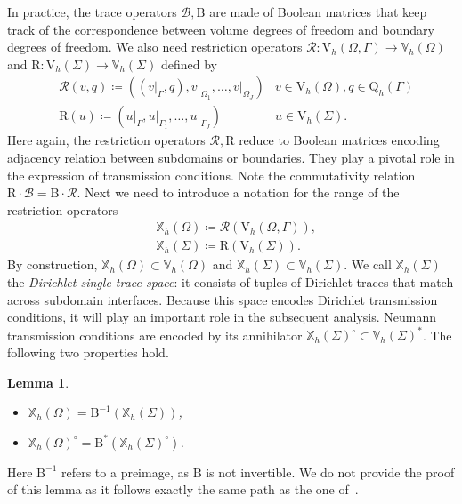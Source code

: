\documentclass[a4paper,11pt]{article}
\newcommand{\mB}{\mathrm{B}}
\newcommand{\mR}{\mathrm{R}}
\newcommand{\mbV}{\mathbb{V}}
\newcommand{\mbX}{\mathbb{X}}
\newcommand{\Vh}{\mathrm{V}_{h}}
\newcommand{\Qh}{\mathrm{Q}_{h}}
\newtheorem{lem}[defn]{Lemma}
\begin{document}
In practice, the trace operators $\mathcal{B},\mB$ are made of Boolean matrices that
keep track of the correspondence between volume degrees of freedom and
boundary degrees of freedom. We also need restriction operators
$\mathcal{R}\colon \Vh(\Omega,\Gamma)\to \mbV_h(\Omega)$ and 
$\mR\colon \Vh(\Sigma)\to \mbV_h(\Sigma)$ defined by 
\begin{equation}\label{DomainRestrictionOperators}
  \begin{aligned}
    & \mathcal{R}(v,q) \coloneq ((v\vert_{\Gamma},q),v\vert_{\Omega_1},\dots, v\vert_{\Omega_J})
    & v\in\Vh(\Omega), q\in \Qh(\Gamma) \\
    & \mR(u)  \coloneq (u\vert_{\Gamma},u\vert_{\Gamma_1},\dots, u\vert_{\Gamma_J})
    & u\in \Vh(\Sigma).
  \end{aligned}
\end{equation}
Here again, the restriction operators $\mathcal{R},\mR$ reduce to
Boolean matrices encoding adjacency relation between subdomains or
boundaries. They play a pivotal role in the expression of
transmission conditions. Note the commutativity relation
$\mR\cdot\mathcal{B} = \mB\cdot\mathcal{R}$. Next we need to introduce
a notation for the range of the restriction operators
\begin{equation}\label{DefinitionSingleTraceSpace}
  \begin{aligned}
    & \mbX_h(\Omega)\coloneq \mathcal{R}(\Vh(\Omega,\Gamma)),\\
    & \mbX_h(\Sigma)\coloneq \mR(\Vh(\Sigma)).
  \end{aligned}
\end{equation}
By construction, $\mbX_h(\Omega)\subset\mbV_h(\Omega)$ and
$\mbX_h(\Sigma)\subset\mbV_h(\Sigma)$. We call $\mbX_h(\Sigma)$ the
\textit{Dirichlet single trace space}: it consists of tuples of Dirichlet
traces that match across subdomain interfaces. Because this space encodes
Dirichlet transmission conditions, it will play an important role in the
subsequent analysis.  Neumann transmission conditions are encoded by its
annihilator $\mbX_h(\Sigma)^{\circ} \subset \mbV_h(\Sigma)^*$.  The
following two properties hold.
\begin{lem}\label{ReformulationTransmission}\quad\\[-15pt]
  \begin{itemize}
  \item[i)]  $\mbX_h(\Omega) = \mB^{-1}(\mbX_h(\Sigma))$,\\[-20pt]
  \item[ii)] $\mbX_h(\Omega)^{\circ} =\mB^{*}(\mbX_h(\Sigma)^{\circ})$.
  \end{itemize}
\end{lem}
\noindent 
Here \(\mB^{-1}\) refers to a preimage, as \(\mB\) is not invertible. We do not provide the proof of this lemma as it follows exactly the
same path as the one of~\cite[Lemma 4.1]{MR4665035}. 
\end{document}
